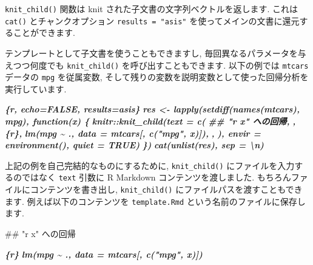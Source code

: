 \documentclass[
  11pt,
  lualatex,
  ja=standard]{bxjsreport}
\newenvironment{Shaded}{\begin{snugshade}}{\end{snugshade}}
\newcommand{\FunctionTok}[1]{\textcolor[rgb]{0.00,0.00,0.00}{#1}}
\newcommand{\InformationTok}[1]{\textcolor[rgb]{0.56,0.35,0.01}{\textbf{\textit{#1}}}}
\begin{document}
\texttt{knit\_child()} 関数は knit された子文書の文字列ベクトルを返します. これは \texttt{cat()} とチャンクオプション \texttt{results = "asis"} を使ってメインの文書に還元することができます.

テンプレートとして子文書を使うこともできますし, 毎回異なるパラメータを与えつつ何度でも \texttt{knit\_child()} を呼び出すこともできます. 以下の例では \texttt{mtcars} データの \texttt{mpg} を従属変数, そして残りの変数を説明変数として使った回帰分析を実行しています.

\begin{Shaded}
\begin{Highlighting}[]
\InformationTok{\textasciigrave{}\textasciigrave{}\textasciigrave{}\{r, echo=FALSE, results=\textquotesingle{}asis\textquotesingle{}\}}
\InformationTok{res \textless{}{-} lapply(setdiff(names(mtcars), \textquotesingle{}mpg\textquotesingle{}), function(x) \{}
\InformationTok{  knitr::knit\_child(text = c(}
\InformationTok{    \textquotesingle{}\#\# "\textasciigrave{}r x\textasciigrave{}" への回帰\textquotesingle{},}
\InformationTok{    \textquotesingle{}\textquotesingle{},}
\InformationTok{    \textquotesingle{}\textasciigrave{}\textasciigrave{}\textasciigrave{}\{r\}\textquotesingle{},}
\InformationTok{    \textquotesingle{}lm(mpg \textasciitilde{} ., data = mtcars[, c("mpg", x)])\textquotesingle{},}
\InformationTok{    \textquotesingle{}\textasciigrave{}\textasciigrave{}\textasciigrave{}\textquotesingle{},}
\InformationTok{    \textquotesingle{}\textquotesingle{}}
\InformationTok{  ), envir = environment(), quiet = TRUE)}
\InformationTok{\})}
\InformationTok{cat(unlist(res), sep = \textquotesingle{}\textbackslash{}n\textquotesingle{})}
\InformationTok{\textasciigrave{}\textasciigrave{}\textasciigrave{}}
\end{Highlighting}
\end{Shaded}

上記の例を自己完結的なものにするために, \texttt{knit\_child()} にファイルを入力するのではなく \texttt{text} 引数に R Markdown コンテンツを渡しました. もちろんファイルにコンテンツを書き出し, \texttt{knit\_child()} にファイルパスを渡すこともできます. 例えば以下のコンテンツを \texttt{template.Rmd} という名前のファイルに保存します.

\begin{Shaded}
\begin{Highlighting}[]
\FunctionTok{\#\# "\textasciigrave{}r x\textasciigrave{}" への回帰}

\InformationTok{\textasciigrave{}\textasciigrave{}\textasciigrave{}\{r\}}
\InformationTok{lm(mpg \textasciitilde{} ., data = mtcars[, c("mpg", x)])}
\InformationTok{\textasciigrave{}\textasciigrave{}\textasciigrave{}}
\end{Highlighting}
\end{Shaded}
\end{document}
